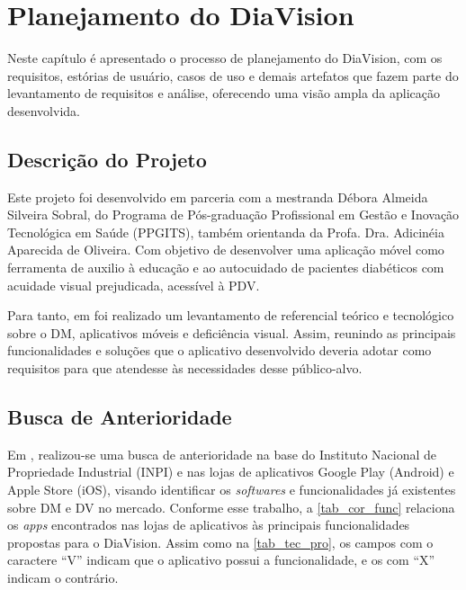 \chapter{Planejamento do DiaVision}
\label{ch:plannig}

Neste capítulo é apresentado o processo de planejamento do DiaVision, com os requisitos, estórias de usuário, casos de uso
e demais artefatos que fazem parte do levantamento de requisitos e análise, oferecendo uma visão ampla da aplicação desenvolvida.

\section{Descrição do Projeto}

Este projeto foi desenvolvido em parceria com a mestranda Débora Almeida Silveira Sobral, do
Programa de Pós-graduação Profissional em Gestão e Inovação Tecnológica em Saúde (PPGITS), também orientanda da Profa.
Dra. Adicinéia Aparecida de Oliveira. Com objetivo de desenvolver uma aplicação móvel como ferramenta de auxilio à educação
e ao autocuidado de pacientes diabéticos com acuidade visual prejudicada, acessível à PDV\@.

Para tanto, em  foi realizado um levantamento de referencial teórico e tecnológico sobre o DM,
aplicativos móveis e deficiência visual. Assim, reunindo as principais funcionalidades e soluções que o aplicativo
desenvolvido deveria adotar como requisitos para que atendesse às necessidades desse público-alvo.

\section{Busca de Anterioridade}

Em , realizou-se uma busca de anterioridade na base do Instituto Nacional de Propriedade Industrial (INPI)
e nas lojas de aplicativos Google Play (Android) e Apple Store (iOS), visando identificar os \emph{softwares} e funcionalidades
já existentes sobre DM e DV no mercado.
Conforme esse trabalho, a \autoref{tab_cor_func} relaciona os \emph{apps} encontrados
nas lojas de aplicativos às principais funcionalidades propostas para o DiaVision. Assim como na \autoref{tab_tec_pro},
os campos com o caractere ``V'' indicam que o aplicativo possui a funcionalidade, e os com ``X'' indicam o contrário.

